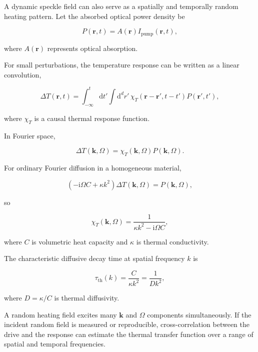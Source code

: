 \documentclass[11pt,letterpaper]{article}
\renewcommand{\dd}{\mathrm{d}}
\newcommand{\ii}{\mathrm{i}}
\begin{document}
A dynamic speckle field can also serve as a spatially and temporally random
heating pattern. Let the absorbed optical power density be

\begin{equation}
    P(\bm{r},t)
    =
    A(\bm{r})I_{\mathrm{pump}}(\bm{r},t),
\end{equation}

where $A(\bm{r})$ represents optical absorption.

For small perturbations, the temperature response can be written as a
linear convolution,

\begin{equation}
    \Delta T(\bm{r},t)
    =
    \int_{-\infty}^{t}\dd t'
    \int\dd^d r'\,
    \chi_T(\bm{r}-\bm{r}',t-t')
    P(\bm{r}',t'),
    \label{eq:thermal_response}
\end{equation}

where $\chi_T$ is a causal thermal response function.

In Fourier space,

\begin{equation}
    \Delta T(\bm{k},\Omega)
    =
    \chi_T(\bm{k},\Omega)
    P(\bm{k},\Omega).
    \label{eq:thermal_transfer}
\end{equation}

For ordinary Fourier diffusion in a homogeneous material,

\begin{equation}
    \left(
    -\ii\Omega C+\kappa k^2
    \right)
    \Delta T(\bm{k},\Omega)
    =
    P(\bm{k},\Omega),
\end{equation}

so

\begin{equation}
    \chi_T(\bm{k},\Omega)
    =
    \frac{1}{
    \kappa k^2-\ii\Omega C
    },
    \label{eq:diffusive_chi}
\end{equation}

where $C$ is volumetric heat capacity and $\kappa$ is thermal conductivity.

The characteristic diffusive decay time at spatial frequency $k$ is

\begin{equation}
    \tau_{\mathrm{th}}(k)
    =
    \frac{C}{\kappa k^2}
    =
    \frac{1}{Dk^2},
\end{equation}

where $D=\kappa/C$ is thermal diffusivity.

A random heating field excites many $\bm{k}$ and $\Omega$ components
simultaneously. If the incident random field is measured or reproducible,
cross-correlation between the drive and the response can estimate the
thermal transfer function over a range of spatial and temporal frequencies.
\end{document}
